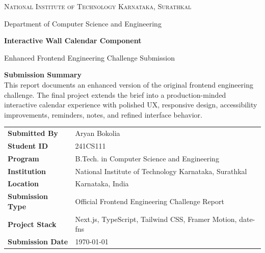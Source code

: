 \documentclass[11pt,a4paper]{article}
\newcommand{\detailrow}[2]{\textbf{#1} & #2 \\}
\begin{document}


\begin{titlepage}
  \centering

  {\Large\textsc{National Institute of Technology Karnataka, Surathkal}\par}
  \vspace{0.5cm}
  {\large Department of Computer Science and Engineering\par}
  \vspace{1.4cm}

  {\Huge\bfseries Interactive Wall Calendar Component\par}
  \vspace{0.4cm}
  {\Large Enhanced Frontend Engineering Challenge Submission\par}
  \vspace{1.2cm}

  \begin{tcolorbox}[
    colback=reportsoft,
    colframe=reportline,
    boxrule=0.6pt,
    arc=4mm,
    width=0.92\textwidth
  ]
    \centering
    \textbf{Submission Summary} \\[0.5em]
    This report documents an enhanced version of the original frontend engineering challenge.
    The final project extends the brief into a production-minded interactive calendar experience
    with polished UX, responsive design, accessibility improvements, reminders, notes, and
    refined interface behavior.
  \end{tcolorbox}

  \vfill

  \renewcommand{\arraystretch}{1.35}
  \begin{tabularx}{0.9\textwidth}{>{\raggedright\arraybackslash}p{}X}
    \detailrow{Submitted By}{Aryan Bokolia}
    \detailrow{Student ID}{241CS111}
    \detailrow{Program}{B.Tech. in Computer Science and Engineering}
    \detailrow{Institution}{National Institute of Technology Karnataka, Surathkal}
    \detailrow{Location}{Karnataka, India}
    \detailrow{Submission Type}{Official Frontend Engineering Challenge Report}
    \detailrow{Project Stack}{Next.js, TypeScript, Tailwind CSS, Framer Motion, date-fns}
    \detailrow{Submission Date}{\today}
  \end{tabularx}

  \vfill
\end{titlepage}
\end{document}
